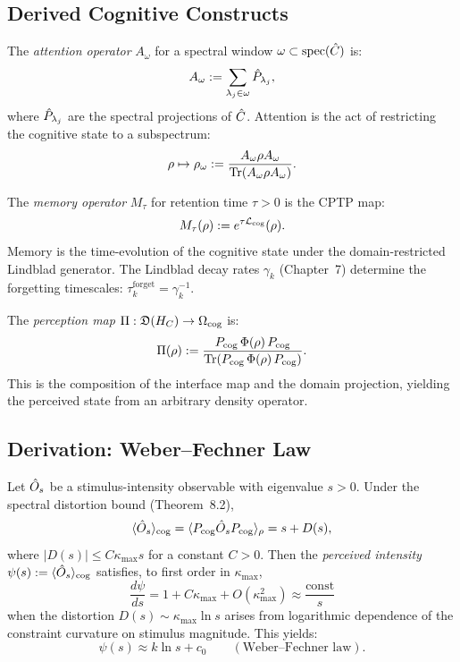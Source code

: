 \subsection{Derived Cognitive Constructs}

\begin{definition}\label{def:16.5}
The \emph{attention operator} $A_\omega$ for a spectral window
$\omega \subset \mathrm{spec}(\hat{C})$ is:
\[
  A_\omega := \sum_{\lambda_j \in \omega} \hat{P}_{\lambda_j},
\]
where $\hat{P}_{\lambda_j}$ are the spectral projections of $\hat{C}$.
Attention is the act of restricting the cognitive state to a
subspectrum:
\[
  \rho \mapsto \rho_\omega :=
  \frac{A_\omega \rho A_\omega}{\mathrm{Tr}(A_\omega \rho A_\omega)}.
\]
\end{definition}

\begin{definition}\label{def:16.6}
The \emph{memory operator} $M_\tau$ for retention time $\tau > 0$
is the CPTP map:
\[
  M_\tau(\rho) := e^{\tau \mathcal{L}_{\mathrm{cog}}}(\rho).
\]
Memory is the time-evolution of the cognitive state under the
domain-restricted Lindblad generator.  The Lindblad decay rates
$\gamma_k$ (Chapter~7) determine the forgetting timescales:
$\tau_k^{\mathrm{forget}} = \gamma_k^{-1}$.
\end{definition}

\begin{definition}\label{def:16.7}
The \emph{perception map} $\Pi : \mathfrak{D}(H_C) \to
\Omega_{\mathrm{cog}}$ is:
\[
  \Pi(\rho) := \frac{P_{\mathrm{cog}} \,\Phi(\rho)\, P_{\mathrm{cog}}}
               {\mathrm{Tr}(P_{\mathrm{cog}} \,\Phi(\rho)\, P_{\mathrm{cog}})}.
\]
This is the composition of the interface map and the domain projection,
yielding the perceived state from an arbitrary density operator.
\end{definition}

\subsection{Derivation: Weber--Fechner Law}

\begin{proposition}\label{prop:16.1}
Let $\hat{O}_s$ be a stimulus-intensity observable with eigenvalue $s > 0$.
Under the spectral distortion bound (Theorem~8.2),
\[
  \langle \hat{O}_s \rangle_{\mathrm{cog}} =
  \langle P_{\mathrm{cog}} \hat{O}_s P_{\mathrm{cog}} \rangle_\rho
  = s + D(s),
\]
where $|D(s)| \leq C \kappa_{\max} s$ for a constant $C > 0$.
Then the \emph{perceived intensity} $\psi(s) :=
\langle \hat{O}_s \rangle_{\mathrm{cog}}$ satisfies, to first order
in $\kappa_{\max}$,
\[
  \frac{d\psi}{ds} = 1 + C \kappa_{\max} + O(\kappa_{\max}^2)
  \approx \frac{\mathrm{const}}{s}
\]
when the distortion $D(s) \sim \kappa_{\max} \ln s$ arises from
logarithmic dependence of the constraint curvature on stimulus
magnitude.  This yields:
\[
  \psi(s) \approx k \ln s + c_0
  \qquad (\text{Weber--Fechner law}).
\]
\end{proposition}

